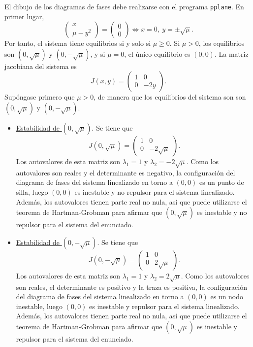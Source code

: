 \documentclass[11pt]{report}
\begin{document}
\begin{solution}
    El dibujo de los diagramas de fases debe realizarse con el programa \texttt{pplane}. En primer lugar,
    \[\left(\begin{array}{c}
        x \\
        \mu-y^2
    \end{array}\right) = \left(\begin{array}{c}
        0 \\
        0
    \end{array}\right) \iff x = 0, \ y=\pm \sqrt{\mu}.\]
    Por tanto, el sistema tiene equilibrios si y solo si $\mu \geq 0$. Si $\mu > 0$, los equilibrios son $(0,\sqrt\mu)$ y $(0,-\sqrt{\mu})$, y si $\mu = 0$, el único equilibrio es $(0,0)$. La matriz jacobiana del sistema es
    \[J(x,y) = \left(\begin{array}{cc}
        1 & 0 \\
        0 & -2y
    \end{array}\right).\]
    Supóngase primero que $\mu > 0$, de manera que los equilibrios del sistema son son $(0,\sqrt{\mu})$ y $(0,-\sqrt{\mu})$.
    \begin{itemize}
        \item \underline{Estabilidad de $(0,\sqrt{\mu})$}. Se tiene que
        \[J(0,\sqrt{\mu}) = \left(\begin{array}{cc}
        1 & 0 \\
        0 & -2\sqrt{\mu}
        \end{array}\right).\]
        Los autovalores de esta matriz son $\lambda_1 = 1$ y $\lambda_2 = -2\sqrt{\mu}$. Como los autovalores son reales y el determinante es negativo, la configuración del diagrama de fases del sistema linealizado en torno a $(0,0)$ es un punto de silla, luego $(0,0)$ es inestable y no repulsor para el sistema linealizado. Además, los autovalores tienen parte real no nula, así que puede utilizarse el teorema de Hartman-Grobman para afirmar que $(0,\sqrt{\mu})$ es inestable y no repulsor para el sistema del enunciado.
        \item \underline{Estabilidad de $(0,-\sqrt{\mu})$}. Se tiene que
        \[J(0,-\sqrt{\mu}) = \left(\begin{array}{cc}
        1 & 0 \\
        0 & 2\sqrt{\mu}
        \end{array}\right).\]
        Los autovalores de esta matriz son $\lambda_1 = 1$ y $\lambda_2 = 2\sqrt{\mu}$. Como los autovalores son reales, el determinante es positivo y la traza es positiva, la configuración del diagrama de fases del sistema linealizado en torno a $(0,0)$ es un nodo inestable, luego $(0,0)$ es inestable y repulsor para el sistema linealizado. Además, los autovalores tienen parte real no nula, así que puede utilizarse el teorema de Hartman-Grobman para afirmar que $(0,\sqrt{\mu})$ es inestable y repulsor para el sistema del enunciado.

\end{itemize}
\end{solution}
\end{document}
